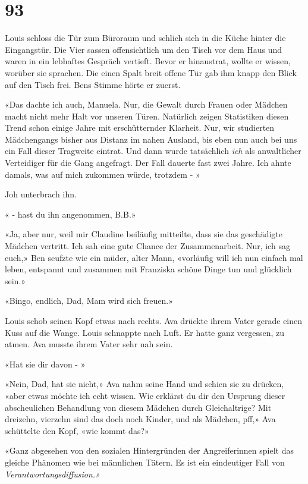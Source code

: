\chapter{93}



Louis schloss die Tür zum Büroraum und schlich sich in die Küche hinter
die Eingangstür. Die Vier sassen offensichtlich um den Tisch vor dem
Haus und waren in ein lebhaftes Gespräch vertieft. Bevor er hinaustrat,
wollte er wissen, worüber sie sprachen. Die einen Spalt breit offene Tür gab ihm knapp den Blick auf den Tisch frei. Bens Stimme hörte er zuerst. 

«Das dachte ich auch, Manuela. Nur, die Gewalt durch Frauen oder Mädchen
macht nicht mehr Halt vor unseren Türen. Natürlich zeigen Statistiken
diesen Trend schon einige Jahre mit erschütternder Klarheit. Nur, wir
studierten Mädchengangs bisher aus Distanz im nahen Ausland, bis eben
nun auch bei uns ein Fall dieser Tragweite eintrat. Und dann wurde
tatsächlich \emph{ich} als anwaltlicher Verteidiger für die Gang
angefragt. Der Fall dauerte fast zwei Jahre. Ich ahnte damals, was auf
mich zukommen würde, trotzdem - »

Joh unterbrach ihn.

« - hast du ihn angenommen, B.B.»

«Ja, aber nur, weil mir Claudine beiläufig mitteilte, dass sie das
geschädigte Mädchen vertritt. Ich sah eine gute Chance der
Zusammenarbeit. Nur, ich sag euch,» Ben seufzte wie ein müder, alter
Mann, «vorläufig will ich nun einfach mal leben, entspannt und zusammen
mit Franziska schöne Dinge tun und glücklich sein.»

«Bingo, endlich, Dad, Mam wird sich freuen.»

Louis schob seinen Kopf etwas nach rechts. Ava drückte ihrem Vater gerade einen Kuss auf die Wange. 
Louis schnappte nach Luft. Er hatte ganz vergessen, zu atmen. Ava musste ihrem Vater sehr nah sein.

«Hat sie dir davon - »

«Nein, Dad, hat sie nicht,» Ava nahm seine Hand und schien sie zu drücken, «aber etwas möchte ich echt wissen. Wie erklärst du dir den
Ursprung dieser abscheulichen Behandlung von diesem Mädchen durch
Gleichaltrige? Mit dreizehn, vierzehn sind das doch noch Kinder, und als
Mädchen, pff,» Ava schüttelte den Kopf, «wie kommt das?»

«Ganz abgesehen von den sozialen Hintergründen der Angreiferinnen spielt
das gleiche Phänomen wie bei männlichen Tätern. Es ist ein eindeutiger
Fall von \emph{Verantwortungsdiffusion.»}

